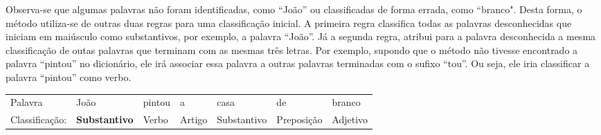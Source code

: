 Observa-se que algumas palavras não foram
identificadas, como ``João'' ou classificadas de forma errada, como
``branco". Desta forma, o método utiliza-se de outras duas regras para uma
classificação inicial.
A primeira regra classifica todas as palavras desconhecidas que iniciam em
maiúsculo como substantivos, por exemplo, a palavra ``João''. Já a segunda regra, atribui para a palavra desconhecida a mesma classificação
de outas palavras que terminam com as mesmas três letras. Por exemplo, supondo que o
método não tivesse encontrado a palavra ``pintou'' no dicionário, ele irá
associar essa palavra a outras palavras terminadas com o sufixo ``tou''. Ou
seja, ele iria classificar a palavra ``pintou'' como verbo.

\begin{table}[htb]
\centering
\begin{tabular}{l|l|l|l|l|l|l}
Palavra         & João        & pintou & a      & casa        & de        
& branco
         \\
Classificação:   & \textbf{Substantivo} & Verbo  & Artigo & Substantivo &
Preposição & Adjetivo
\end{tabular}
\label{my-label}
\end{table}



